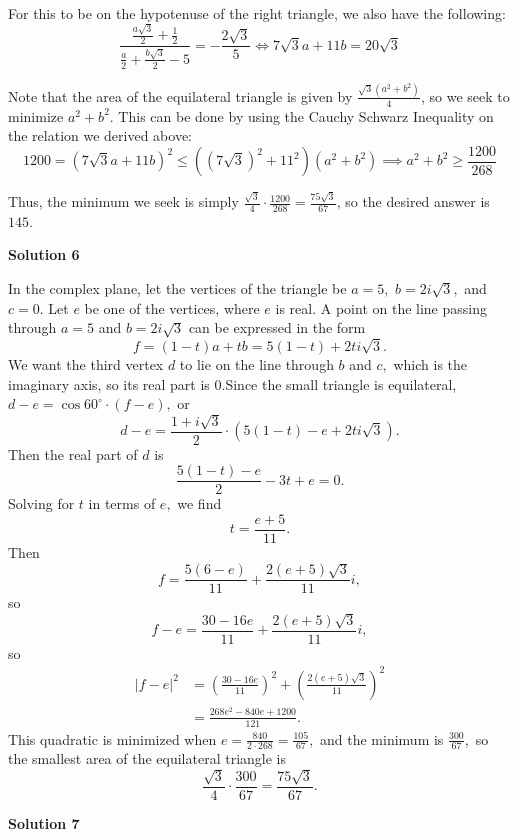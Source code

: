\begin{enumerate}
 For this to be on the hypotenuse of the right triangle, we also have the following:
 \[\frac{\frac{a\sqrt{3}}{2}+\frac{1}{2}}{\frac{a}{2}+\frac{b\sqrt{3}}{2}-5}=-\frac{2\sqrt{3}}{5}\iff 7\sqrt{3}a+11b=20\sqrt{3}\]

 Note that the area of the equilateral triangle is given by $\frac{\sqrt{3}(a^2+b^2)}{4}$, so we seek to minimize $a^2+b^2$. This can be done by using the Cauchy Schwarz Inequality on the relation we derived above:
 \[1200=(7\sqrt{3}a+11b)^2\leq ((7\sqrt{3})^2+11^2)(a^2+b^2)\implies a^2+b^2\geq \frac{1200}{268}\]

 Thus, the minimum we seek is simply $\frac{\sqrt{3}}{4}\cdot\frac{1200}{268}=\frac{75\sqrt{3}}{67}$, so the desired answer is $\boxed{145}$.

 



\textbf{Solution 6}

In the complex plane, let the vertices of the triangle be $a = 5,$ $b = 2i \sqrt{3},$ and $c = 0.$ Let $e$ be one of the vertices, where $e$ is real. A point on the line passing through $a = 5$ and $b = 2i \sqrt{3}$ can be expressed in the form
 \[f = (1 - t) a + tb = 5(1 - t) + 2ti \sqrt{3}.\]We want the third vertex $d$ to lie on the line through $b$ and $c,$ which is the imaginary axis, so its real part is 0.Since the small triangle is equilateral, $d - e = \cos 60^\circ \cdot (f - e),$ or
 \[d - e = \frac{1 + i \sqrt{3}}{2} \cdot (5(1 - t) - e + 2ti \sqrt{3}).\]Then the real part of $d$ is
 \[\frac{5(1 - t) - e}{2} - 3t + e = 0.\]Solving for $t$ in terms of $e,$ we find
 \[t = \frac{e + 5}{11}.\]Then
 \[f = \frac{5(6 - e)}{11} + \frac{2(e + 5) \sqrt{3}}{11} i,\]so
 \[f - e = \frac{30 - 16e}{11} + \frac{2(e + 5) \sqrt{3}}{11} i,\]so
 \begin{align*} |f - e|^2 &= \left( \frac{30 - 16e}{11} \right)^2 + \left( \frac{2(e + 5) \sqrt{3}}{11} \right)^2 \\ &= \frac{268e^2 - 840e + 1200}{121}. \end{align*}
This quadratic is minimized when $e = \frac{840}{2 \cdot 268} = \frac{105}{67},$ and the minimum is $\frac{300}{67},$ so the smallest area of the equilateral triangle is
 \[\frac{\sqrt{3}}{4} \cdot \frac{300}{67} = \boxed{\frac{75 \sqrt{3}}{67}}.\]




\textbf{Solution 7}


\end{enumerate}
